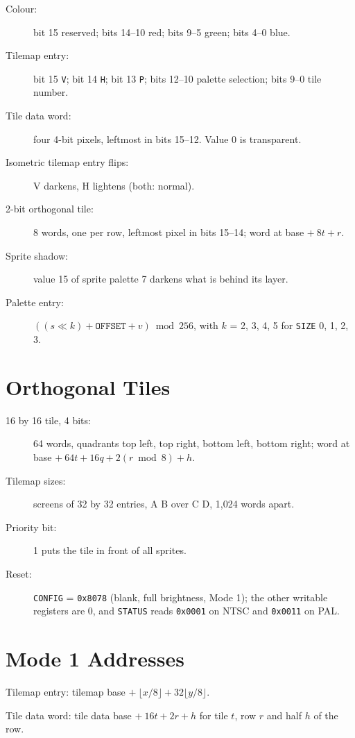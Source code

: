 \begin{description}
	\item[Colour:] bit 15 reserved; bits 14--10 red; bits 9--5 green; bits 4--0 blue.
	\item[Tilemap entry:] bit 15 \texttt{V}; bit 14 \texttt{H}; bit 13 \texttt{P}; bits 12--10 palette selection; bits 9--0 tile
	      number.
	\item[Tile data word:] four 4-bit pixels, leftmost in bits 15--12. Value 0 is transparent.
	\item[Isometric tilemap entry flips:] V darkens, H lightens (both: normal).
	\item[2-bit orthogonal tile:] 8 words, one per row, leftmost pixel in bits 15--14; word at base $+\ 8t + r$.
	\item[Sprite shadow:] value 15 of sprite palette 7 darkens what is behind its layer.
	\item[Palette entry:] $((s \ll k) + \texttt{OFFSET} + v) \bmod 256$, with $k$ = 2, 3, 4, 5 for \texttt{SIZE} 0, 1, 2, 3.
\end{description}

\section{Orthogonal Tiles}

\begin{description}
	\item[16 by 16 tile, 4 bits:] 64 words, quadrants top left, top right, bottom left, bottom right; word at base $+\ 64t + 16q +
		      2(r \bmod 8) + h$.
	\item[Tilemap sizes:] screens of 32 by 32 entries, A B over C D, 1,024 words apart.
	\item[Priority bit:] 1 puts the tile in front of all sprites.
	\item[Reset:] \texttt{CONFIG} = \texttt{0x8078} (blank, full brightness, Mode 1); the other writable registers are 0, and
	      \texttt{STATUS} reads \texttt{0x0001} on NTSC and \texttt{0x0011} on PAL.
\end{description}

\section{Mode 1 Addresses}

Tilemap entry: tilemap base $+\ \lfloor x/8 \rfloor + 32\lfloor y/8 \rfloor$.

Tile data word: tile data base $+\ 16t + 2r + h$ for tile $t$, row $r$ and half $h$ of the row.

